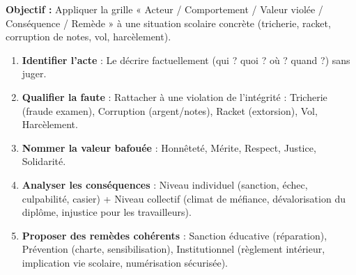 \documentclass[11pt]{article}
\newcommand{\cle}[1]{{\popxbold\color{popdark}#1}}
\begin{document}
\begin{methode}
    \textbf{Objectif :} Appliquer la grille « Acteur / Comportement / Valeur violée / Conséquence / Remède » à une situation scolaire concrète (tricherie, racket, corruption de notes, vol, harcèlement).
    \begin{enumerate}
        \item \textbf{Identifier l'acte} : Le décrire factuellement (qui ? quoi ? où ? quand ?) sans juger.
        \item \textbf{Qualifier la faute} : Rattacher à une violation de l'intégrité : \cle{Tricherie} (fraude examen), \cle{Corruption} (argent/notes), \cle{Racket} (extorsion), \cle{Vol}, \cle{Harcèlement}.
        \item \textbf{Nommer la valeur bafouée} : Honnêteté, Mérite, Respect, Justice, Solidarité.
        \item \textbf{Analyser les conséquences} : Niveau individuel (sanction, échec, culpabilité, casier) + Niveau collectif (climat de méfiance, dévalorisation du diplôme, injustice pour les travailleurs).
        \item \textbf{Proposer des remèdes cohérents} : Sanction éducative (réparation), Prévention (charte, sensibilisation), Institutionnel (règlement intérieur, implication vie scolaire, numérisation sécurisée).
    \end{enumerate}
\end{methode}
\end{document}
